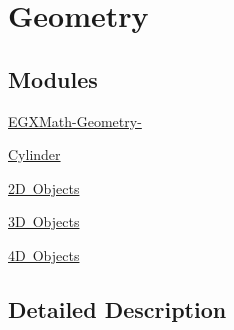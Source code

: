 \hypertarget{group___e_g_x_math-_geometry}{}\section{Geometry}
\label{group___e_g_x_math-_geometry}
\subsection*{Modules}
\begin{DoxyCompactItemize}
\item 
\mbox{\hyperlink{group___e_g_x_math-_geometry-}{E\+G\+X\+Math-\/\+Geometry-\/}}
\item 
\mbox{\hyperlink{group___e_g_x_math-_geometry-_cylinder}{Cylinder}}
\item 
\mbox{\hyperlink{group___e_g_x_math-_geometry-2_d}{2\+D Objects}}
\item 
\mbox{\hyperlink{group___e_g_x_math-_geometry-3_d}{3\+D Objects}}
\item 
\mbox{\hyperlink{group___e_g_x_math-_geometry-4_d}{4\+D Objects}}
\end{DoxyCompactItemize}


\subsection{Detailed Description}
